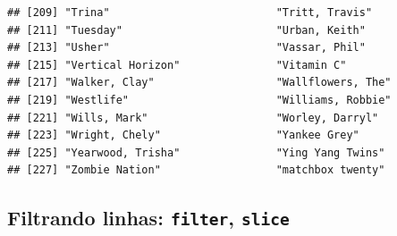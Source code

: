\documentclass[
  11pt]{report}
\begin{document}
\begin{itemize}
\begin{verbatim}
## [209] "Trina"                          "Tritt, Travis"                 
## [211] "Tuesday"                        "Urban, Keith"                  
## [213] "Usher"                          "Vassar, Phil"                  
## [215] "Vertical Horizon"               "Vitamin C"                     
## [217] "Walker, Clay"                   "Wallflowers, The"              
## [219] "Westlife"                       "Williams, Robbie"              
## [221] "Wills, Mark"                    "Worley, Darryl"                
## [223] "Wright, Chely"                  "Yankee Grey"                   
## [225] "Yearwood, Trisha"               "Ying Yang Twins"               
## [227] "Zombie Nation"                  "matchbox twenty"
\end{verbatim}
\end{itemize}

\hypertarget{filtrando-linhas-filter-slice}{%
\subsection{\texorpdfstring{Filtrando linhas: \texttt{filter}, \texttt{slice}}{Filtrando linhas: filter, slice}}\label{filtrando-linhas-filter-slice}}
\end{document}
